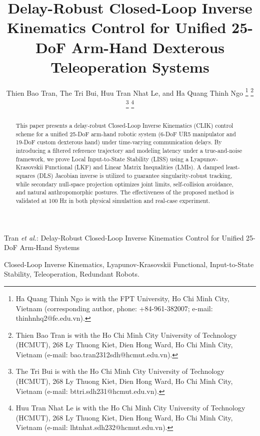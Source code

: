 \documentclass[letterpaper,journal]{IEEEtran}
\begin{document}
\title{Delay-Robust Closed-Loop Inverse Kinematics Control for Unified 25-DoF Arm-Hand Dexterous Teleoperation Systems}

\author{Thien Bao Tran, The Tri Bui, Huu Tran Nhat Le, and Ha Quang Thinh Ngo
\thanks{Ha Quang Thinh Ngo is with the FPT University, Ho Chi Minh City, Vietnam (corresponding author, phone: +84-961-382007; e-mail: thinhnhq2@fe.edu.vn).}%
\thanks{Thien Bao Tran is with the Ho Chi Minh City University of Technology (HCMUT), 268 Ly Thuong Kiet, Dien Hong Ward, Ho Chi Minh City, Vietnam (e-mail: bao.tran2312sdh@hcmut.edu.vn).}%
\thanks{The Tri Bui is with the Ho Chi Minh City University of Technology (HCMUT), 268 Ly Thuong Kiet, Dien Hong Ward, Ho Chi Minh City, Vietnam (e-mail: bttri.sdh231@hcmut.edu.vn).}%
\thanks{Huu Tran Nhat Le is with the Ho Chi Minh City University of Technology (HCMUT), 268 Ly Thuong Kiet, Dien Hong Ward, Ho Chi Minh City, Vietnam (e-mail: lhtnhat.sdh232@hcmut.edu.vn).}}

%
{Tran \MakeLowercase{\textit{et al.}}: Delay-Robust Closed-Loop Inverse Kinematics Control for Unified 25-DoF Arm-Hand Systems}

\maketitle

\begin{abstract}
This paper presents a delay-robust Closed-Loop Inverse Kinematics (CLIK) control scheme for a unified 25-DoF arm-hand robotic system (6-DoF UR5 manipulator and 19-DoF custom dexterous hand) under time-varying communication delays. By introducing a filtered reference trajectory and modeling latency under a true-and-noise framework, we prove Local Input-to-State Stability (LISS) using a Lyapunov-Krasovskii Functional (LKF) and Linear Matrix Inequalities (LMIs). A damped least-squares (DLS) Jacobian inverse is utilized to guarantee singularity-robust tracking, while secondary null-space projection optimizes joint limits, self-collision avoidance, and natural anthropomorphic postures. The effectiveness of the proposed method is validated at 100 Hz in both physical simulattion and real-case experiment.
\end{abstract}

\begin{IEEEkeywords}
Closed-Loop Inverse Kinematics, Lyapunov-Krasovskii Functional, Input-to-State Stability, Teleoperation, Redundant Robots.
\end{IEEEkeywords}
\end{document}
